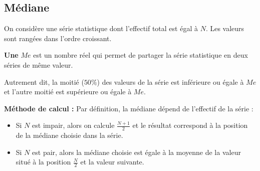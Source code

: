 \documentclass[10pt,openright,twoside,french]{book}
\begin{document}
\subsection{Médiane}

\begin{Defi}
    On considère une série statistique dont l'effectif total est égal à $N$. Les valeurs sont rangées dans l'ordre croissant.

    \textbf{Une}  $Me$ est un nombre réel qui permet de partager la série statistique en deux séries de même valeur.

    Autrement dit, la moitié ($50\%$) des valeurs de la série est inférieure ou égale à $Me$ et l'autre moitié est supérieure ou égale à $Me$.

\begin{center}
\end{center}
\end{Defi}

\textbf{Méthode de calcul :} Par définition, la médiane dépend de l'effectif de la série :
\begin{itemize}
    \item Si $N$ est impair, alors on calcule $\frac{N + 1}{2}$ et le résultat correspond à la position de la médiane choisie dans la série.
    \item Si $N$ est pair, alors la médiane choisie est égale à la moyenne de la valeur situé à la position $\frac N 2$ et la valeur suivante.
\end{itemize}
\end{document}
